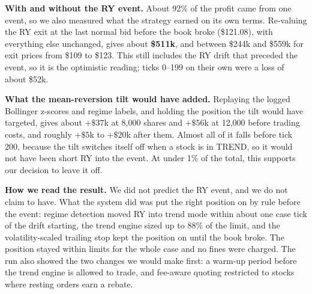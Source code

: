 \textbf{With and without the RY event.} About 92\% of the profit came from one event, so we also measured what the strategy earned on its own terms. Re-valuing the RY exit at the last normal bid before
the book broke (\$121.08), with everything else unchanged, gives about \textbf{\$511k}, and between \$244k and \$559k for exit prices from \$109 to \$123. This still includes the RY drift that preceded the
event, so it is the optimistic reading; ticks 0--199 on their own were a loss of about \$52k.

\textbf{What the mean-reversion tilt would have added.} Replaying the logged Bollinger z-scores and regime labels, and holding the position the tilt would have targeted, gives about $+\$37$k at 8{,}000
shares and $+\$56$k at 12{,}000 before trading costs, and roughly $+\$5$k to $+\$20$k after them. Almost all of it falls before tick 200, because the tilt switches itself off when a stock is in TREND,
so it would not have been short RY into the event. At under 1\% of the total, this supports our decision to leave it off.

\textbf{How we read the result.} We did not predict the RY event, and we do not claim to have. What the system did was put the right position on by rule before the event: regime detection moved RY
into trend mode within about one case tick of the drift starting, the trend engine sized up to 88\% of the limit, and the volatility-scaled trailing stop kept the position on until the book broke.
The position stayed within limits for the whole case and no fines were charged. The run also showed the two changes we would make first: a warm-up period before the trend engine is allowed to trade,
and fee-aware quoting restricted to stocks where resting orders earn a rebate.
